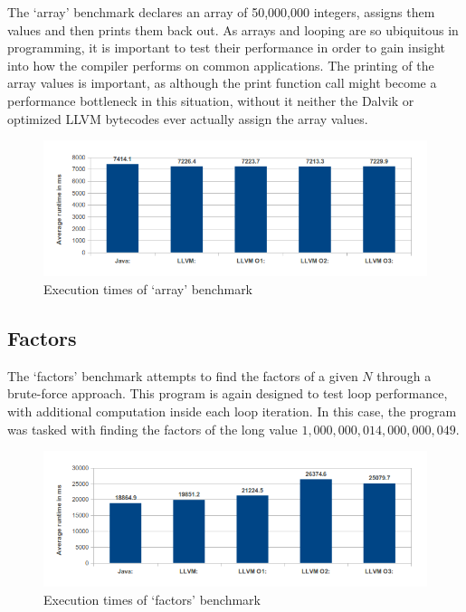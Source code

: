 The `array' benchmark declares an array of 50,000,000 integers, assigns them values and then prints them back out. As arrays and looping are so ubiquitous in programming, it is important to test their performance in order to gain insight into how the compiler performs on common applications. The printing of the array values is important, as although the print function call might become a performance bottleneck in this situation, without it neither the Dalvik or optimized LLVM bytecodes ever actually assign the array values.

\begin{figure}[h!]
    \centering
    \includegraphics[width=1.0\textwidth]{images/res_array.png}
    \caption{Execution times of `array' benchmark}
    \label{fig:res_array}
\end{figure}



\subsection*{Factors}

The `factors' benchmark attempts to find the factors of a given $N$ through a brute-force approach. This program is again designed to test loop performance, with additional computation inside each loop iteration. In this case, the program was tasked with finding the factors of the long value $1,000,000,014,000,000,049$.

\begin{figure}[h!]
    \centering
    \includegraphics[width=1.0\textwidth]{images/res_factors.png}
    \caption{Execution times of `factors' benchmark}
    \label{fig:res_factors}
\end{figure}

